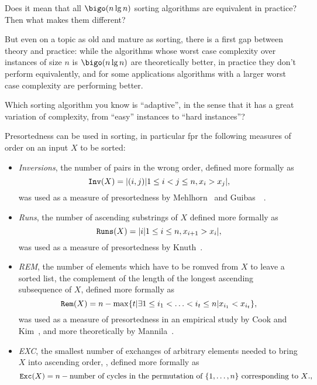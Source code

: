 \begin{interaction}
  Does it mean that all $\bigo(n\lg n)$ sorting algorithms are
  equivalent in practice? Then what makes them different?
\end{interaction}

But even on a topic as old and mature as sorting, there is a first gap
between theory and practice: while the algorithms whose worst case
complexity over instances of size $n$ is $\bigo(n\lg n)$ are
theoretically better, in practice they don't perform equivalently, and
for some applications algorithms with a larger worst case complexity
are performing better.


\begin{interaction}
  Which sorting algorithm you know is ``adaptive'', in the sense that
  it has a great variation of complexity, from ``easy'' instances to
  ``hard instances''?
\end{interaction}


Presortedness can be used in sorting, in particular fpr the following
measures of order on an input $X$ to be sorted:

\begin{itemize}

\item \emph{Inversions}, the number of pairs in the wrong order,
  defined more formally as
$${\mathtt{Inv}}(X)=|{(i,j) | 1\leq i<j\leq n, x_i>x_j}|,$$
was used as a measure of presortedness by Mehlhorn~\cite{mehlhorn} and
Guibas~\etal~\cite{guibas}.

\item \emph{Runs}, the number of ascending substrings of $X$
  defined more formally as
  $$\mathtt{Runs}(X)=|{i | 1\leq i\leq n, x_{i+1}>x_i}|,$$
  was used as a measure of presortedness by
  Knuth~\cite{theArtOfComputerProgrammingVol3}.

\item \emph{REM}, the number of elements which have to be romved from
  $X$ to leave a sorted list, the complement of the length of the
  longest ascending subsequence of $X$,
  defined more formally as
  $$\mathtt{Rem}(X)= n-\max \{t | \exists 1\leq i_1<\ldots<i_t\leq n | x_{i_1} < x_{i_t} \},$$
  was used as a measure of presortedness in an empirical study by Cook
  and Kim~\cite{cook}, and more theoretically by
  Mannila~\cite{measuresOfPresortednessAndOptimalSortingAlgorithms}.

\item \emph{EXC}, the smallest number of exchanges of arbitrary
  elements needed to bring $X$ into ascending order, ,
  defined more formally as
  $$\mathtt{Exc}(X)= n-\mbox{number of cycles in the permutation of $\{1,\ldots,n\}$ corresponding to $X$.},$$

\end{itemize}




